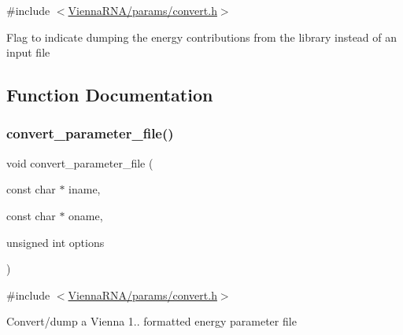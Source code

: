 {\ttfamily \#include $<$\hyperlink{convert_8h}{Vienna\+R\+N\+A/params/convert.\+h}$>$}

Flag to indicate dumping the energy contributions from the library instead of an input file 

\subsection{Function Documentation}
\mbox{\label{group__energy__parameters__convert_gafbe538bc4eb2cf2a33326e1010005f8a}} 
\subsubsection{\texorpdfstring{convert\+\_\+parameter\+\_\+file()}{convert\_parameter\_file()}}
{\footnotesize\ttfamily void convert\+\_\+parameter\+\_\+file (\begin{DoxyParamCaption}\item[{const char $\ast$}]{iname,  }\item[{const char $\ast$}]{oname,  }\item[{unsigned int}]{options }\end{DoxyParamCaption})}



{\ttfamily \#include $<$\hyperlink{convert_8h}{Vienna\+R\+N\+A/params/convert.\+h}$>$}

Convert/dump a Vienna 1.. formatted energy parameter file

